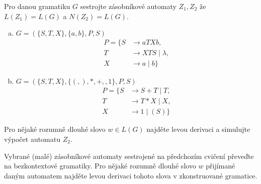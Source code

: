 \documentclass[a4paper,12pt]{amsart}
\begin{document}
\bigskip\begin{problem}
    Pro danou gramatiku $G$ sestrojte zásobníkové automaty $Z_1,Z_2$ že $L(Z_1)=L(G)$ a $N(Z_2)=L(G)$.

    \bigskip

    \begin{enumerate}[(a)]\setlength\itemsep{12pt}
    \item $G=(\{S,T,X\},\{a,b\},P,S)$
        \begin{align*}
    P=\{S&\rightarrow aTXb, \\
    T&\rightarrow XTS\mid \lambda,\\ 
    X&\rightarrow a\mid b\}
    \end{align*}
    \item $G=(\{S,T,X\},\{(,),*,+,,1\},P,S)$
        \begin{align*}
    P=\{S&\rightarrow S+T\mid T, \\
    T&\rightarrow T*X\mid X,\\ 
    X&\rightarrow 1\mid (S)\}
    \end{align*}
    \end{enumerate}
    Pro nějaké rozumně dlouhé slovo $w\in L(G)$ najděte levou derivaci a simulujte výpočet automatu $Z_2$.
    \end{problem}
    
    \bigskip\begin{problem}
    Vybrané (malé) zásobníkové automaty sestrojené na předchozím cvičení převeďte na bezkontextové gramatiky. Pro nějaké rozumně dlouhé slovo $w$ přijímané daným automatem najděte levou derivaci tohoto slova v zkonstruované gramatice.
    \end{problem}
\end{document}
